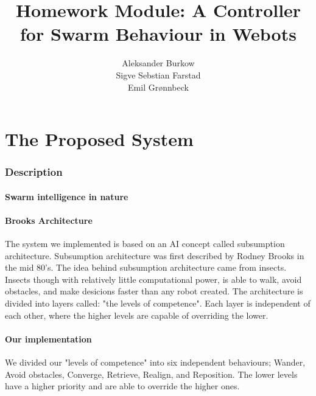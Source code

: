 \documentclass{article}
\title{Homework Module: A Controller for Swarm Behaviour in Webots}
\author{
    Aleksander Burkow \\
    Sigve Sebstian Farstad \\
    Emil Grønnbeck
}
\begin{document}
\maketitle
\thispagestyle{empty}


\newpage

\setcounter{page}{1}

\part{The Proposed System}

\section{Description}


\subsection{Swarm intelligence in nature}



\subsection{Brooks Architecture}
The system we implemented is based on an AI concept called subsumption architecture. Subsumption architecture was first described by Rodney Brooks in the mid 80's. The idea behind subsumption architecture came from insects. Insects though with relatively little computational power, is able to walk, avoid obstacles, and make desicions faster than any robot created. The architecture is divided into layers called: "the levels of competence". Each layer is  independent of each other, where the higher levels are capable of overriding the lower.

\subsection{Our implementation}
We divided our "levels of competence" into six independent behaviours; Wander, Avoid obstacles, Converge, Retrieve, Realign, and Reposition. The lower levels have a higher priority and are able to override the higher ones.

\end{document}
